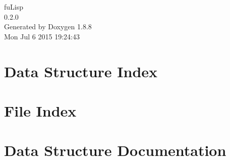 \documentclass[twoside]{book}
\newcommand{\+}{\discretionary{\mbox{\scriptsize$\hookleftarrow$}}{}{}}
\newcommand{\clearemptydoublepage}{%
  \newpage{\pagestyle{empty}\cleardoublepage}%
}
\begin{document}
\hypersetup{pageanchor=false,
             bookmarks=true,
             bookmarksnumbered=true,
             pdfencoding=unicode
            }
\begin{titlepage}
\vspace*{7cm}
\begin{center}%
{\Large fu\+Lisp \\[1ex]\large 0.\+2.\+0 }\\
\vspace*{1cm}
{\large Generated by Doxygen 1.8.8}\\
\vspace*{0.5cm}
{\small Mon Jul 6 2015 19:24:43}\\
\end{center}
\end{titlepage}
\clearemptydoublepage
\tableofcontents
\clearemptydoublepage
{}
\hypersetup{pageanchor=true}

\chapter{Data Structure Index}

\chapter{File Index}

\chapter{Data Structure Documentation}
















\end{document}
